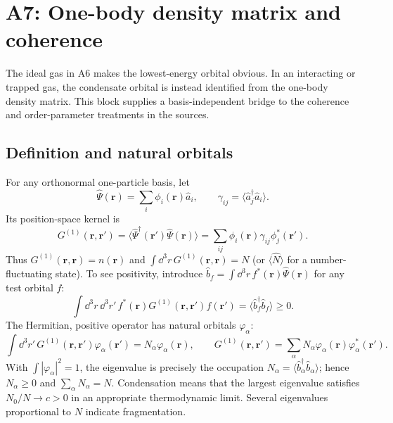 \section{A7: One-body density matrix and coherence}
\label{sec:A7}
The ideal gas in A6 makes the lowest-energy orbital obvious. In an interacting or trapped gas, the condensate orbital is instead identified from the one-body density matrix. This block supplies a basis-independent bridge to the coherence and order-parameter treatments in the sources.

\subsection*{Definition and natural orbitals}
For any orthonormal one-particle basis, let
\[
\hat\Psi(\mathbf r)=\sum_i\phi_i(\mathbf r)\hat a_i,\qquad
\gamma_{ij}=\langle\hat a_j^\dagger\hat a_i\rangle.
\]
Its position-space kernel is
\[
G^{(1)}(\mathbf r,\mathbf r')
=\langle\hat\Psi^\dagger(\mathbf r')\hat\Psi(\mathbf r)\rangle
=\sum_{ij}\phi_i(\mathbf r)\gamma_{ij}\phi_j^*(\mathbf r').
\]
Thus $G^{(1)}(\mathbf r,\mathbf r)=n(\mathbf r)$ and
$\int\dd^3r\,G^{(1)}(\mathbf r,\mathbf r)=N$ (or $\langle\hat N\rangle$ for a number-fluctuating state). To see positivity, introduce
$\hat b_f=\int\dd^3r\,f^*(\mathbf r)\hat\Psi(\mathbf r)$ for any test orbital $f$:
\[
\int\dd^3r\,\dd^3r'\,f^*(\mathbf r)
G^{(1)}(\mathbf r,\mathbf r')f(\mathbf r')
=\langle\hat b_f^\dagger\hat b_f\rangle\geq0.
\]
The Hermitian, positive operator has natural orbitals $\varphi_\alpha$:
\[
\int\dd^3r'\,G^{(1)}(\mathbf r,\mathbf r')\varphi_\alpha(\mathbf r')
=N_\alpha\varphi_\alpha(\mathbf r),\qquad
G^{(1)}(\mathbf r,\mathbf r')
=\sum_\alpha N_\alpha\varphi_\alpha(\mathbf r)\varphi_\alpha^*(\mathbf r').
\]
With $\int|\varphi_\alpha|^2=1$, the eigenvalue is precisely the occupation
$N_\alpha=\langle\hat b_\alpha^\dagger\hat b_\alpha\rangle$; hence
$N_\alpha\geq0$ and $\sum_\alpha N_\alpha=N$. Condensation means that the largest eigenvalue satisfies $N_0/N\to c>0$ in an appropriate thermodynamic limit. Several eigenvalues proportional to $N$ indicate fragmentation.

